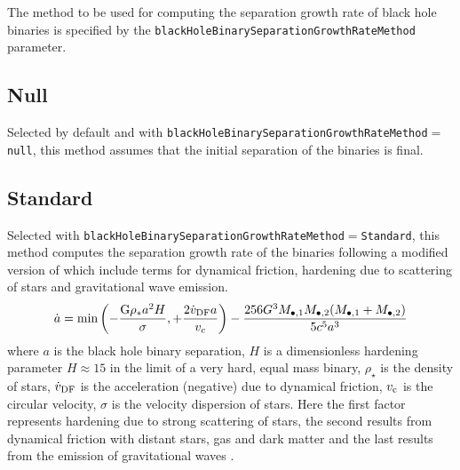The method to be used for computing the separation growth rate of black hole binaries is specified by the {\tt blackHoleBinarySeparationGrowthRateMethod} parameter.

\subsection{Null}

Selected by default and with {\tt blackHoleBinarySeparationGrowthRateMethod}$=${\tt null}, this method assumes that the initial separation of the binaries is final.

\subsection{Standard}

Selected with {\tt blackHoleBinarySeparationGrowthRateMethod}$=${\tt Standard}, this method computes the separation growth rate of the binaries following a modified version of \cite {volonteri_assembly_2003} which include terms for dynamical friction, hardening due to scattering of stars and gravitational wave emission.
\begin{equation}
\dot{a} = \hbox{min} \left( - \frac{{\rm G}\rho _{*}a^2 H}{\sigma}, +\frac{2 \dot{v}_{\rm DF} a}{v_c} \right) - \frac{256 G^3 M_{\bullet, 1} M_{\bullet, 2} (M_{\bullet, 1} +M_{\bullet, 2})}{5 c^5 a^3}
\end{equation}
where $a$ is the black hole binary
separation, $H$ is a dimensionless hardening parameter $H\approx 15$ in the limit of 
a very hard, equal mass binary, $\rho _\star$ is the density of stars,
$\dot{v}_{\rm DF}$ is the acceleration (negative) due to dynamical friction,
$v_{\rm c}$ is the circular velocity, $\sigma$ is the velocity dispersion of stars. Here the first factor represents hardening due to strong scattering of stars, the second results from dynamical friction with distant stars, gas and dark matter and the last results from the emission of gravitational waves \cite{peters_gravitational_1964}.

